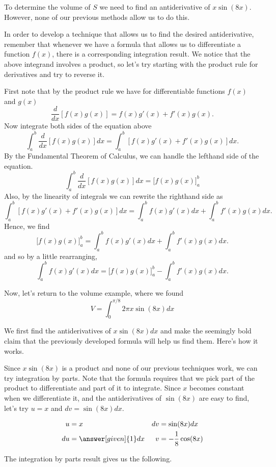 \documentclass[noauthor]{ximera}
\begin{document}
\begin{model}
To determine the volume of $S$ we need to find an antiderivative of $x\sin(8x)$. However, none of our previous methods allow us to do this.

In order to develop a technique that allows us to find the desired antiderivative, remember that whenever we have a formula that allows us to differentiate a function $f(x)$, there is a corresponding integration result.  We notice that the above integrand involves a product, so let's try starting with the product rule for derivatives and try to reverse it.  

First note that by the product rule we have for differentiable functions $f(x)$ and $g(x)$
\[
\frac{d}{dx} \left[f(x)g(x)\right] = f(x)g'(x) + f'(x) g(x).
\]
Now integrate both sides of the equation above
\[
\int_a^b \frac{d}{dx} \left[ f(x) g(x) \right] dx = \int_a^b \left[f(x)g'(x) + f'(x) g(x)\right] dx.
\]
By the Fundamental Theorem of Calculus, we can handle the lefthand side of the equation.
\[
\int_a^b \frac{d}{dx} \left[f(x) g(x)\right] dx = \bigg[f(x)g(x)\bigg]_a^b
\]
Also, by the linearity of integrals we can rewrite the righthand side as
\[
 \int_a^b \left[f(x)g'(x) + f'(x) g(x)\right] dx = \int_a^b f(x)g'(x) dx + \int_a^b f'(x) g(x) dx.
\]
Hence, we find
\[
\bigg[f(x)g(x)\bigg]_a^b = \int_a^b f(x)g'(x) dx + \int_a^b f'(x) g(x) dx.
\]
and so by a little rearranging,
\[
 \int_a^b f(x)g'(x) dx = \bigg[f(x)g(x)\bigg]_a^b -  \int_a^b f'(x) g(x) dx.
\]

Now, let's return to the volume example, where we found
\[
V=\int_{0}^{\pi/8} 2 \pi x\sin(8x) dx
\]

We first find the antiderivatives of $x\sin(8x) dx$ and make the seemingly bold claim that the previously developed formula will help us find them.  Here's how it works.

Since $x\sin(8x)$ is a product and none of our previous techniques work, we can try integration by parts.  Note that the formula requires that we pick part of the product to differentiate and part of it to integrate.  Since $x$ becomes constant when we differentiate it, and the antiderivatives of $\sin(8x)$ are easy to find, let's try $u=x$ and $dv=\sin(8x) dx$.  

\begin{align*}
u &= x & dv & = \sin(8x) dx \\
 du &= \answer[given]{1} dx & v&=-\frac{1}{8}\cos(8x)
\end{align*}

The integration by parts result gives us the following.


\end{model}
\end{document}
